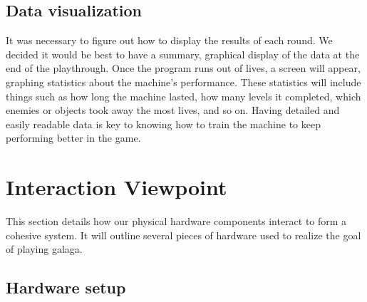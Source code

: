 \documentclass{onecolumn, draftclsnofoot,10pt, compsoc}[IEEEtran]
\begin{document}
\subsection{Data visualization}%

It was necessary to figure out how to display the results of each round.
We decided it would be best to have a summary, graphical display of the data at the end of the playthrough.
Once the program runs out of lives, a screen will appear, graphing statistics about the machine's performance.
These statistics will include things such as how long the machine lasted, how many levels it completed, which enemies or objects took away the most lives, and so on.
Having detailed and easily readable data is key to knowing how to train the machine to keep performing better in the game.


\newpage

\section{Interaction Viewpoint}\label{sssec:num1}%

This section details how our physical hardware components interact to form a cohesive system.
It will outline several pieces of hardware used to realize the goal of playing galaga.

\subsection{Hardware setup}%
\end{document}
